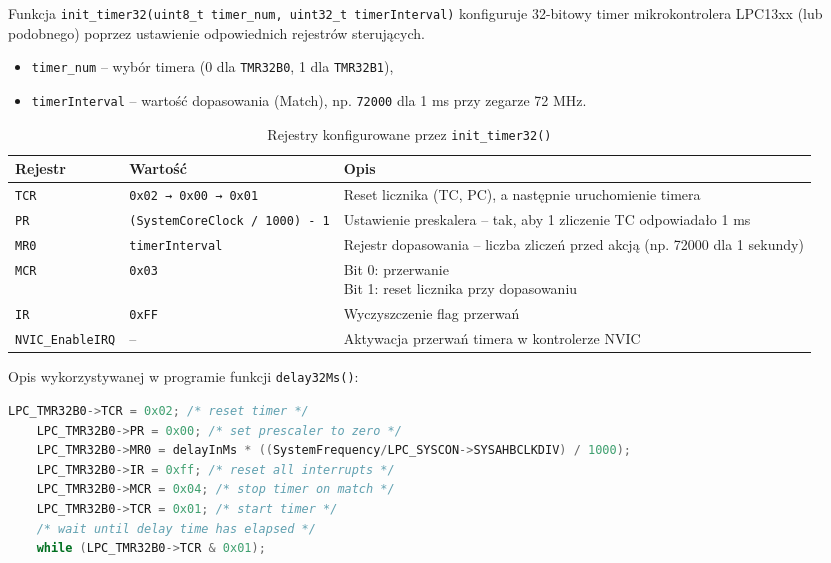 \documentclass[letterpaper,11pt]{report}
\begin{document}
Funkcja \texttt{init\_timer32(uint8\_t timer\_num, uint32\_t timerInterval)} konfiguruje 32-bitowy timer mikrokontrolera LPC13xx (lub podobnego) poprzez ustawienie odpowiednich rejestrów sterujących.

\begin{itemize}
    \item \texttt{timer\_num} – wybór timera (0 dla \texttt{TMR32B0}, 1 dla \texttt{TMR32B1}),
    \item \texttt{timerInterval} – wartość dopasowania (Match), np. \texttt{72000} dla 1 ms przy zegarze 72 MHz.
\end{itemize}

\begin{table}[h!]
\centering
{
    \small
    \begin{tabularx}{\textwidth}{|l|p{4cm}|X|}
    \hline
    \textbf{Rejestr} & \textbf{Wartość} & \textbf{Opis} \\
    \hline
    \texttt{TCR} & \texttt{0x02 → 0x00 → 0x01} & Reset licznika (TC, PC), a następnie uruchomienie timera \\
    \hline
    \texttt{PR} & \texttt{(SystemCoreClock / 1000) - 1} & Ustawienie preskalera – tak, aby 1 zliczenie TC odpowiadało 1 ms \\
    \hline
    \texttt{MR0} & \texttt{timerInterval} & Rejestr dopasowania – liczba zliczeń przed akcją (np. 72000 dla 1 sekundy) \\
    \hline
    \texttt{MCR} & \texttt{0x03} & \makecell[l]{Bit 0: przerwanie \\ Bit 1: reset licznika przy dopasowaniu} \\
    \hline
    \texttt{IR} & \texttt{0xFF} & Wyczyszczenie flag przerwań \\
    \hline
    \texttt{NVIC\_EnableIRQ} & -- & Aktywacja przerwań timera w kontrolerze NVIC \\
    \hline
    \end{tabularx}
}
\caption{Rejestry konfigurowane przez \texttt{init\_timer32()}}
\end{table}

Opis wykorzystywanej w programie funkcji \texttt{delay32Ms()}:\\
\begin{lstlisting}[language=C]
    LPC_TMR32B0->TCR = 0x02; /* reset timer */
    LPC_TMR32B0->PR = 0x00; /* set prescaler to zero */
    LPC_TMR32B0->MR0 = delayInMs * ((SystemFrequency/LPC_SYSCON->SYSAHBCLKDIV) / 1000);
    LPC_TMR32B0->IR = 0xff; /* reset all interrupts */
    LPC_TMR32B0->MCR = 0x04; /* stop timer on match */
    LPC_TMR32B0->TCR = 0x01; /* start timer */
    /* wait until delay time has elapsed */
    while (LPC_TMR32B0->TCR & 0x01);
\end{lstlisting}
\end{document}
